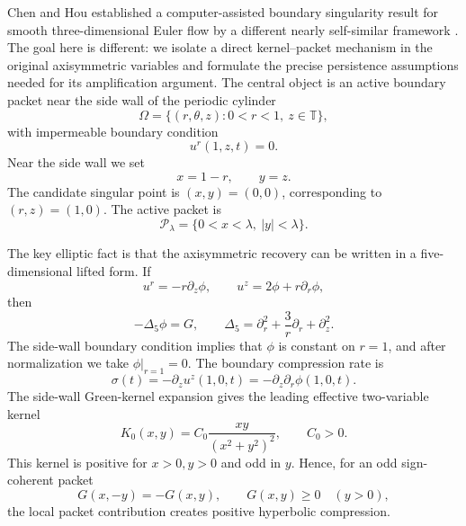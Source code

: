 \documentclass[11pt]{amsart}
\begin{document}
Chen and Hou established a computer-assisted boundary singularity result for smooth three-dimensional Euler flow by a different nearly self-similar framework \cite{ChenHou2025}.  The goal here is different: we isolate a direct kernel--packet mechanism in the original axisymmetric variables and formulate the precise persistence assumptions needed for its amplification argument.  The central object is an active boundary packet near the side wall of the periodic cylinder
\begin{equation}\label{eq:cylinder}
\Omega=\{(r,\theta,z):0<r<1,\ z\in\mathbb T\},
\end{equation}
with impermeable boundary condition
\begin{equation}\label{eq:impermeable}
u^r(1,z,t)=0.
\end{equation}
Near the side wall we set
\begin{equation}\label{eq:flat_coords}
x=1-r,
\qquad
y=z.
\end{equation}
The candidate singular point is \((x,y)=(0,0)\), corresponding to \((r,z)=(1,0)\).  The active packet is
\begin{equation}\label{eq:packet_intro}
\mathcal P_\lambda=\{0<x<\lambda,
\ |y|<\lambda\}.
\end{equation}

The key elliptic fact is that the axisymmetric recovery can be written in a five-dimensional lifted form.  If
\begin{equation}\label{eq:phi_recovery_intro}
u^r=-r\partial_z\phi,
\qquad
u^z=2\phi+r\partial_r\phi,
\end{equation}
then
\begin{equation}\label{eq:5d_recovery_intro}
-\Delta_5\phi=G,
\qquad
\Delta_5=\partial_r^2+\frac3r\partial_r+\partial_z^2.
\end{equation}
The side-wall boundary condition implies that \(\phi\) is constant on \(r=1\), and after normalization we take \(\phi|_{r=1}=0\).  The boundary compression rate is
\begin{equation}\label{eq:sigma_intro}
\sigma(t)=-\partial_z u^z(1,0,t)=-\partial_z\partial_r\phi(1,0,t).
\end{equation}
The side-wall Green-kernel expansion gives the leading effective two-variable kernel
\begin{equation}\label{eq:K0_intro}
K_0(x,y)=C_0\frac{xy}{(x^2+y^2)^2},
\qquad C_0>0.
\end{equation}
This kernel is positive for \(x>0,y>0\) and odd in \(y\).  Hence, for an odd sign-coherent packet
\[
G(x,-y)=-G(x,y),
\qquad
G(x,y)\ge0\quad(y>0),
\]
the local packet contribution creates positive hyperbolic compression.
\end{document}
